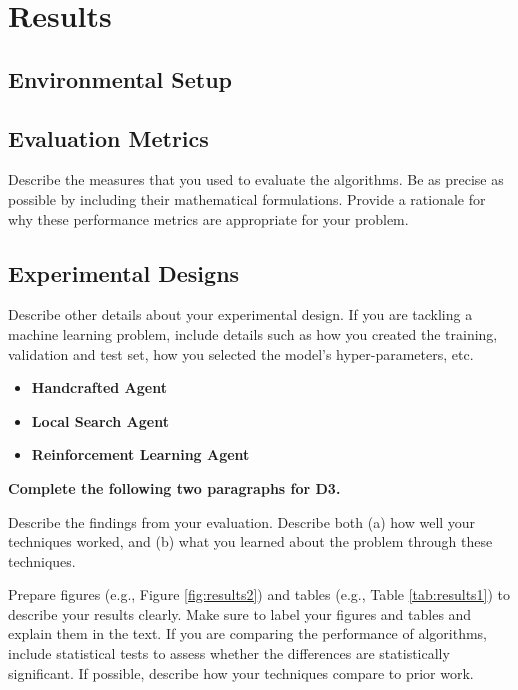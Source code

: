 \documentclass[letterpaper]{article} %
\begin{document}

\section{Results}
\subsection{Environmental Setup}
\subsection{Evaluation Metrics}
Describe the measures that you used to evaluate the algorithms.  Be as precise as possible by including their mathematical formulations.  Provide a rationale for why these performance metrics are appropriate for your problem.
\subsection{Experimental Designs}
Describe other details about your experimental design.  If you are tackling a machine learning problem, include details such as how you created the training, validation and test set, how you selected the model's hyper-parameters, etc.    
\begin{itemize}
  \item \textbf{Handcrafted Agent} 
  \item \textbf{Local Search Agent} 
  \item \textbf{Reinforcement Learning Agent} 
\end{itemize}





{\bf Complete the following two paragraphs for D3.}

Describe the findings from your evaluation.  Describe both (a) how well your techniques worked, and (b) what you learned about the problem through these techniques.  

Prepare figures (e.g., Figure \ref{fig:results2}) and tables (e.g., Table \ref{tab:results1}) to describe your results clearly.  Make sure to label your figures and tables and explain them in the text.  If you are comparing the performance of algorithms, include statistical tests to assess whether the differences are statistically significant.  If possible, describe how your techniques compare to prior work.  
\end{document}
